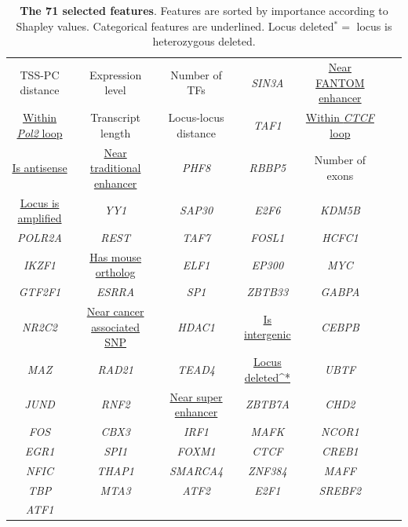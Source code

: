 \begin{table}[!htb]
  \caption[The 71 selected features]{\textbf{The 71 selected features}. Features are sorted by importance according to Shapley values. Categorical features are underlined. Locus deleted$^*=$ locus is heterozygous deleted.}
  \begin{scriptsize}
    \begin{tabulary}{0.95\linewidth}{ccccccc}
      TSS-PC distance & Expression level &  Number of TFs & \textit{SIN3A} & \underline{Near FANTOM enhancer} \\
      \underline{Within \textit{Pol2} loop} & Transcript length & Locus-locus distance & \textit{TAF1} & \underline{Within \textit{CTCF} loop} \\
      \underline{Is antisense} & \underline{Near traditional enhancer} &  \textit{PHF8} & \textit{RBBP5} & Number of exons \\
      \underline{Locus is amplified} & \textit{YY1} & \textit{SAP30} & \textit{E2F6} & \textit{KDM5B} \\
      \textit{POLR2A} & \textit{REST} & \textit{TAF7} & \textit{FOSL1} & \textit{HCFC1} \\
      \textit{IKZF1} &  \underline{Has mouse ortholog} & \textit{ELF1} & \textit{EP300} & \textit{MYC} \\
      \textit{GTF2F1} & \textit{ESRRA} & \textit{SP1} & \textit{ZBTB33} & \textit{GABPA} \\
      \textit{NR2C2} & \underline{Near cancer associated SNP} & \textit{HDAC1} & \underline{Is intergenic} & \textit{CEBPB} \\
      \textit{MAZ} & \textit{RAD21} & \textit{TEAD4} & \underline{Locus deleted^*} & \textit{UBTF} \\
      \textit{JUND} & \textit{RNF2} & \underline{Near super enhancer} & \textit{ZBTB7A} & \textit{CHD2} \\
      \textit{FOS} & \textit{CBX3} & \textit{IRF1} & \textit{MAFK} & \textit{NCOR1} \\
      \textit{EGR1} & \textit{SPI1} & \textit{FOXM1} & \textit{CTCF} & \textit{CREB1} \\
      \textit{NFIC} & \textit{THAP1} & \textit{SMARCA4} & \textit{ZNF384} & \textit{MAFF} \\
      \textit{TBP} & \textit{MTA3} & \textit{ATF2} & \textit{E2F1} & \textit{SREBF2} \\
      \textit{ATF1} \\
    \end{tabulary}
  \end{scriptsize}
  \label{tab:71-features}
\end{table}

